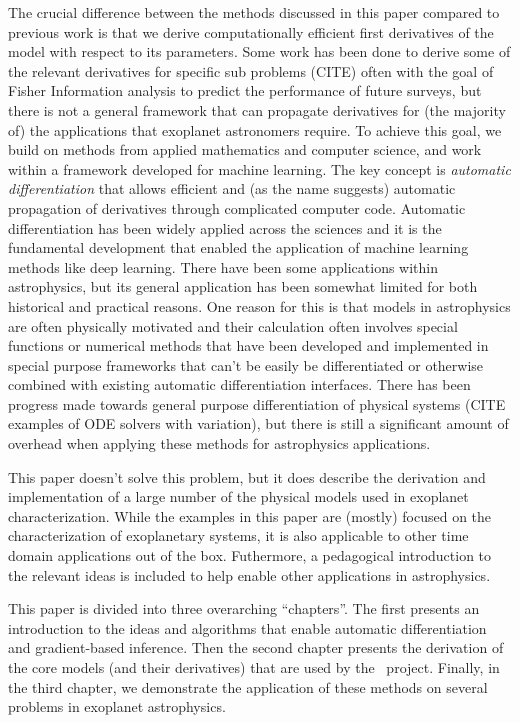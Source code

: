 \documentclass[modern]{aastex62}
\begin{document}
The crucial difference between the methods discussed in this paper compared to previous work is that we derive computationally efficient first derivatives of the model with respect to its parameters.
Some work has been done to derive some of the relevant derivatives for specific sub problems (CITE) often with the goal of Fisher Information analysis to predict the performance of future surveys, but there is not a general framework that can propagate derivatives for (the majority of) the applications that exoplanet astronomers require.
To achieve this goal, we build on methods from applied mathematics and computer science, and work within a framework developed for machine learning.
The key concept is \emph{automatic differentiation} that allows efficient and (as the name suggests) automatic propagation of derivatives through complicated computer code.
Automatic differentiation has been widely applied across the sciences and it is the fundamental development that enabled the application of machine learning methods like deep learning.
There have been some applications within astrophysics, but its general application has been somewhat limited for both historical and practical reasons.
One reason for this is that models in astrophysics are often physically motivated and their calculation often involves special functions or numerical methods that have been developed and implemented in special purpose frameworks that can't be easily be differentiated or otherwise combined with existing automatic differentiation interfaces.
There has been progress made towards general purpose differentiation of physical systems (CITE examples of ODE solvers with variation), but there is still a significant amount of overhead when applying these methods for astrophysics applications.

This paper doesn't solve this problem, but it does describe the derivation and implementation of a large number of the physical models used in exoplanet characterization.
While the examples in this paper are (mostly) focused on the characterization of exoplanetary systems, it is also applicable to other time domain applications out of the box.
Futhermore, a pedagogical introduction to the relevant ideas is included to help enable other applications in astrophysics.

This paper is divided into three overarching ``chapters''.
The first presents an introduction to the ideas and algorithms that enable automatic differentiation and gradient-based inference.
Then the second chapter presents the derivation of the core models (and their derivatives) that are used by the \exoplanet\ project.
Finally, in the third chapter, we demonstrate the application of these methods on several problems in exoplanet astrophysics.
\end{document}
